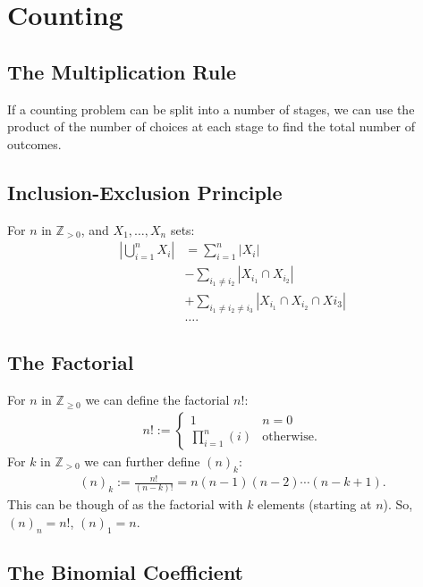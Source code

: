 \section{Counting}

\subsection{The Multiplication Rule}

If a counting problem can be split into a number of stages, we can
use the product of the number of choices at each stage to find
the total number of outcomes.

\subsection{Inclusion-Exclusion Principle}

For $n$ in $\mathbb{Z}_{> 0}$, and $X_1, \ldots, X_n$ sets: \begin{align*}
  \left|\bigcup_{i = 1}^n X_i\right| &= \sum_{i = 1}^n |X_i| \\
  &-\sum_{i_1 \neq i_2} |X_{i_1} \cap X_{i_2}| \\
  &+\sum_{i_1 \neq i_2 \neq i_3} |X_{i_1} \cap X_{i_2} \cap X{i_3}| \\
  &\ldots.
\end{align*}

\subsection{The Factorial}

For $n$ in $\mathbb{Z}_{\geq 0}$ we can define the factorial $n!$: \begin{align*}
  n! := \begin{cases*}
    1 & n = 0 \\
    \prod_{i = 1}^n(i) & \text{otherwise.}
  \end{cases*}
\end{align*} For $k$ in $\mathbb{Z}_{> 0}$ we can further define $(n)_k$: \begin{gather*}
  (n)_k := \frac{n!}{(n-k)!} = n(n-1)(n-2)\cdots(n-k+1).
\end{gather*} This can be though of as the factorial with $k$
elements (starting at $n$). So, $(n)_n = n!$, $(n)_1 = n$.

\subsection{The Binomial Coefficient}


